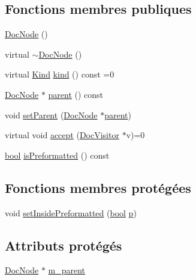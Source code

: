 \subsection*{Fonctions membres publiques}
\begin{DoxyCompactItemize}
\item 
\hyperlink{class_doc_node_a98d902adedf9b2270a6673e59dbab89e}{Doc\+Node} ()
\item 
virtual \hyperlink{class_doc_node_a024e5ba89b140e83416f9f85f5f6d036}{$\sim$\+Doc\+Node} ()
\item 
virtual \hyperlink{class_doc_node_aebd16e89ca590d84cbd40543ea5faadb}{Kind} \hyperlink{class_doc_node_a92d4aaa169a813ded919aa858024c809}{kind} () const  =0
\item 
\hyperlink{class_doc_node}{Doc\+Node} $\ast$ \hyperlink{class_doc_node_a990d8b983962776a647e6231d38bd329}{parent} () const 
\item 
void \hyperlink{class_doc_node_a2855de7ff1248fdb71e579087ae56098}{set\+Parent} (\hyperlink{class_doc_node}{Doc\+Node} $\ast$\hyperlink{class_doc_node_a990d8b983962776a647e6231d38bd329}{parent})
\item 
virtual void \hyperlink{class_doc_node_a5303a550cbe6395663bf9b9dad28cbf1}{accept} (\hyperlink{class_doc_visitor}{Doc\+Visitor} $\ast$v)=0
\item 
\hyperlink{qglobal_8h_a1062901a7428fdd9c7f180f5e01ea056}{bool} \hyperlink{class_doc_node_aef508bc4dc916756c919594db7930d54}{is\+Preformatted} () const 
\end{DoxyCompactItemize}
\subsection*{Fonctions membres protégées}
\begin{DoxyCompactItemize}
\item 
void \hyperlink{class_doc_node_a7059408f429dc1358764e334079ca986}{set\+Inside\+Preformatted} (\hyperlink{qglobal_8h_a1062901a7428fdd9c7f180f5e01ea056}{bool} \hyperlink{060__command__switch_8tcl_a15229b450f26d8fa1c10bea4f3279f4d}{p})
\end{DoxyCompactItemize}
\subsection*{Attributs protégés}
\begin{DoxyCompactItemize}
\item 
\hyperlink{class_doc_node}{Doc\+Node} $\ast$ \hyperlink{class_doc_node_a5f1139016d8919795a0e1c722d3e4b91}{m\+\_\+parent}
\end{DoxyCompactItemize}


